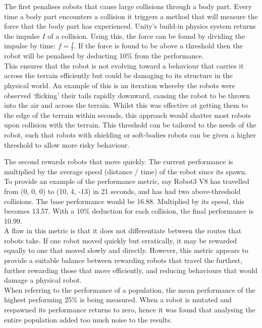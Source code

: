 \documentclass{article}
\begin{document}
The first penalises robots that cause large collisions through a body part. Every time a body part encounters a collision it triggers a method that will measure the force that the body part has experienced. Unity's build-in physics system returns the impulse $I$ of a collision. Using this, the force can be found by dividing the impulse by time: {\Large $f = \frac{I}{t}$}. 
If the force is found to be above a threshold then the robot will be penalised by deducting 10\% from the performance. \\
This ensures that the robot is not evolving toward a behaviour that carries it across the terrain efficiently but could be damaging to its structure in the physical world. An example of this is an iteration whereby the robots were observed ‘flicking’ their tails rapidly downward, causing the robot to be thrown into the air and across the terrain. Whilst this was effective at getting them to the edge of the terrain within seconds, this approach would shatter most robots upon collision with the terrain. This threshold can be tailored to the needs of the robot, such that robots with shielding or soft-bodies robots can be given a higher threshold to allow more risky behaviour.

The second rewards robots that move quickly. The current performance is multiplied by the average speed (distance / time) of the robot since its spawn. 
\\[1\baselineskip] 
To provide an example of the performance metric, say Robot3 V8 has travelled from (0, 0, 0) to (10, 4, -13) in 21 seconds, and has had two above-threshold collisions. The base performance would be 16.88. Multiplied by its speed, this becomes 13.57. With a 10\% deduction for each collision, the final performance is 10.99. \\
A flaw in this metric is that it does not differentiate between the routes that robots take. If one robot moved quickly but erratically, it may be rewarded equally to one that moved slowly and directly. However, this metric appears to provide a suitable balance between rewarding robots that travel the furthest, further rewarding those that move efficiently, and reducing behaviours that would damage a physical robot. \\

When referring to the performance of a population, the mean performance of the highest performing 25\% is being measured. When a robot is mutated and respawned its performance returns to zero, hence it was found that analysing the entire population added too much noise to the results. 
\end{document}
